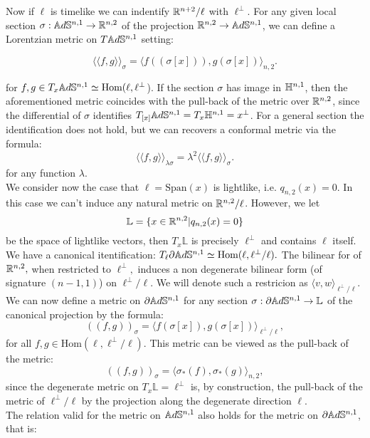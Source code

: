Now if $\ell$ is timelike we can indentify $\mathbb{R}^{n+2}/\ell$ with $\ell^{\perp}.$ For any given local section $\sigma:\mathbb{A}d\mathbb{S}^{n,1}\to \mathbb{R}^{n,2}$ of the projection $\mathbb{R}^{n,2}\to \mathbb{A}d\mathbb{S}^{n,1}$, we can define a Lorentzian metric on $T\mathbb{A}d\mathbb{S}^{n,1}$ setting:

\[
    \langle \langle f,g \rangle \rangle_{\sigma}=\langle f((\sigma[x])),g(\sigma[x])\rangle_{n,2}. 
\]

for $f,g\in T_{x}\mathbb{A}d\mathbb{S}^{n,1}\simeq \text{Hom}(\ell,\ell^\perp$). If the section $\sigma$ has image in $\mathbb{H}^{n,1}$, then the aforementioned metric coincides with the pull-back of the metric over $\mathbb{R}^{n,2}$, since the differential of $\sigma $ identifies $T_{[x]}\mathbb{A}d\mathbb{S}^{n,1}=T_x\mathbb{H}^{n,1}=x^\perp$. For a general section the identification does not hold, but we can recovers a conformal metric via the formula: 
\[
    \langle \langle f,g \rangle \rangle_{\lambda\sigma}=\lambda^2\langle \langle f,g \rangle \rangle_{\sigma}.
\] for any function $\lambda$.\\
We consider now the case that $\ell=\text{Span}(x)$ is lightlike, i.e. $q_{n,2}(x)=0$. In this case we can't induce any natural metric on $\mathbb{R}^{n,2}/\ell$. However, we let 
\[
    \mathbb{L}=\{x\in \mathbb{R}^{n,2}|q_{n,2}(x)=0\}
\]
be the space of lightlike vectors, then $T_x\mathbb{L}$ is precisely $\ell^{\perp}$ and contains $\ell$ itself. We have a canonical itentification: $T_\ell\partial\mathbb{A}d\mathbb{S}^{n,1}\simeq\text{Hom}(\ell,\ell^{\perp }/\ell).$ The bilinear for of $\mathbb{R}^{n,2},$ when restricted to $\ell^{\perp},$ induces a non degenerate bilinear form (of signature $(n-1,1)$) on $\ell^\perp/\ell.$ We will denote such a restricion as $\langle v,w\rangle_{\ell^{\perp}/\ell}.$ \\
We can now define a metric on $\partial\mathbb{A}d\mathbb{S}^{n,1}$ for any section $\sigma:\partial\mathbb{A}d\mathbb{S}^{n,1}\to \mathbb{L}$ of the canonical projection by the formula:
\begin{equation}
    ((f,g))_{\sigma}=\langle f(\sigma[x]),g(\sigma[x])\rangle_{\ell^{\perp}/\ell},
\end{equation}
for all $f,g\in \text{Hom}(\ell, \ell^\perp/\ell).$ This metric can be viewed as the pull-back of the metric: 
\begin{equation}
    ((f,g))_\sigma=\langle \sigma_*(f), \sigma_{\ast} (g)\rangle_{n,2}, 
\end{equation}
since the degenerate metric on $T_x\mathbb{L}=\ell^\perp$ is, by construction, the pull-back of the metric of $\ell^{\perp}/\ell$ by the projection along the degenerate direction $\ell$.\\ 
The relation valid for the metric on $\mathbb{A}d\mathbb{S}^{n,1}$ also holds for the metric on $\partial\mathbb{A}d\mathbb{S}^{n,1}$, that is: 
